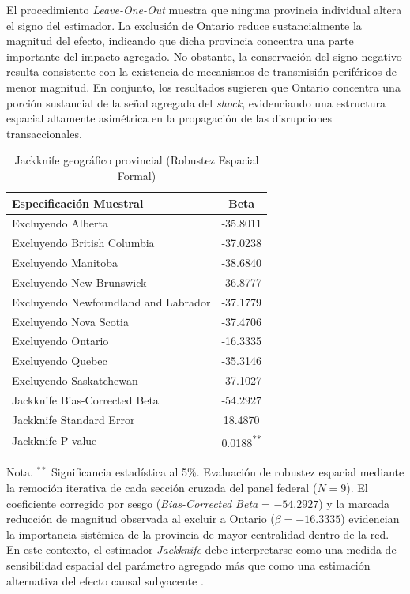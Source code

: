 El procedimiento \textit{Leave-One-Out} muestra que ninguna provincia individual altera el signo del estimador. La exclusi\'on de Ontario reduce sustancialmente la magnitud del efecto, indicando que dicha provincia concentra una parte importante del impacto agregado. No obstante, la conservaci\'on del signo negativo resulta consistente con la existencia de mecanismos de transmisi\'on perif\'ericos de menor magnitud. En conjunto, los resultados sugieren que Ontario concentra una porci\'on sustancial de la se\~nal agregada del \textit{shock}, evidenciando una estructura espacial altamente asim\'etrica en la propagaci\'on de las disrupciones transaccionales.

\begin{table}[H]
\centering
\caption{Jackknife geogr\'afico provincial (Robustez Espacial Formal)}
\label{tab:jackknife_provinces}
\begin{tabular}{lc}
\hline\hline
Especificaci\'on Muestral & Beta \\ \hline
Excluyendo Alberta                   & -35.8011      \\
Excluyendo British Columbia          & -37.0238      \\
Excluyendo Manitoba                  & -38.6840      \\
Excluyendo New Brunswick             & -36.8777      \\
Excluyendo Newfoundland and Labrador & -37.1779      \\
Excluyendo Nova Scotia               & -37.4706      \\
Excluyendo Ontario                   & -16.3335      \\
Excluyendo Quebec                    & -35.3146      \\
Excluyendo Saskatchewan              & -37.1027      \\ \hline
Jackknife Bias-Corrected Beta        & -54.2927      \\
Jackknife Standard Error             & 18.4870       \\
Jackknife P-value                    & 0.0188\textsuperscript{**} \\
\hline\hline
\end{tabular}
\vspace{0.15cm}
\begin{flushleft}
\small{Nota. $^{**}$ Significancia estad\'istica al 5\%. Evaluaci\'on de robustez espacial mediante la remoci\'on iterativa de cada secci\'on cruzada del panel federal ($N = 9$). El coeficiente corregido por sesgo (\textit{Bias-Corrected Beta} = $-54.2927$) y la marcada reducci\'on de magnitud observada al excluir a Ontario ($\beta = -16.3335$) evidencian la importancia sist\'emica de la provincia de mayor centralidad dentro de la red. En este contexto, el estimador \textit{Jackknife} debe interpretarse como una medida de sensibilidad espacial del par\'ametro agregado m\'as que como una estimaci\'on alternativa del efecto causal subyacente \citep{carvalho2021supply}.}
\end{flushleft}
\end{table}

